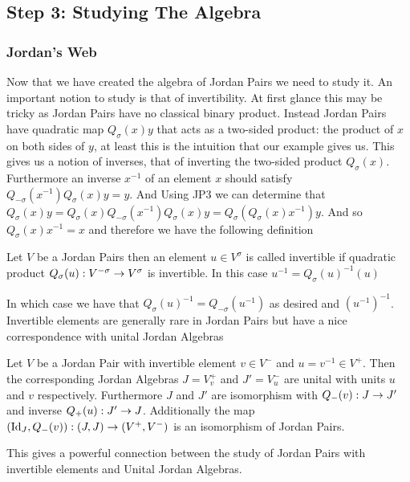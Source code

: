 \subsection{Step 3: Studying The Algebra}
\subsubsection*{Jordan's Web}
Now that we have created the algebra of Jordan Pairs we need to study it. An important notion to study is that of invertibility.
At first glance this may be tricky as Jordan Pairs have no classical binary product. Instead Jordan Pairs have quadratic map $Q_\sigma(x)y$
that acts as a two-sided product: the product of $x$ on both sides of $y$, at least this is the intuition that our example gives us.
This gives us a notion of inverses, that of inverting the two-sided product $Q_\sigma(x)$.
Furthermore an inverse $x^{-1}$ of an element $x$ should satisfy $Q_{-\sigma}(x^{-1})Q_\sigma(x)y=y$.
And Using JP3 we can determine that $Q_\sigma(x)y=Q_\sigma(x)Q_{-\sigma}(x^{-1})Q_\sigma(x)y=Q_\sigma(Q_\sigma(x)x^{-1})y$.
 And so $Q_\sigma(x)x^{-1}=x$ and therefore we have the following definition

\begin{definition}
    Let $V$ be a Jordan Pairs then an element $u\in V^\sigma$ is called invertible if 
    quadratic product $Q_\sigma(u):V^{-\sigma}\rightarrow V^{\sigma}$ is invertible. In this case 
    $u^{-1}=Q_\sigma(u)^{-1}(u)$
\end{definition}

In which case we have that $Q_\sigma(u)^{-1}=Q_{-\sigma}(u^{-1})$ as desired and $(u^{-1})^{-1}$.
Invertible elements are generally rare in Jordan Pairs but have a nice correspondence with unital Jordan Algebras

\begin{prop}
    Let $V$ be a Jordan Pair with invertible element $v\in V^{-}$ and $u=v^{-1}\in V^{+}$. Then the 
    corresponding Jordan Algebras $J=V^{+}_v$ and $J'=V^-_u$ are unital with units $u$ 
    and $v$ respectively. Furthermore $J$ and $J'$ are isomorphism with $Q_-(v):J\rightarrow J'$ and inverse $Q_+(u):J'\rightarrow J$. Additionally
    the map $(\text{Id}_J, Q_{-}(v)):(J,J)\rightarrow (V^+,V^-)$ is an isomorphism of Jordan Pairs.
\end{prop}

This gives a powerful connection between the study of Jordan Pairs with invertible elements
and Unital Jordan Algebras.


